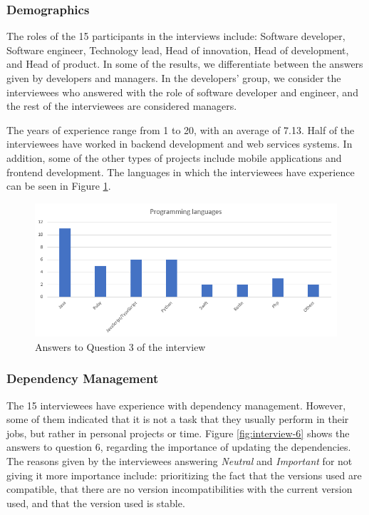 \subsubsection{Demographics}

The roles of the 15 participants in the interviews include: Software developer, Software engineer, Technology lead, Head of innovation, Head of development, and Head of product. In some of the results, we differentiate between the answers given by developers and managers. In the developers' group, we consider the interviewees who answered with the role of software developer and engineer, and the rest of the interviewees are considered managers. 

The years of experience range from 1 to 20, with an average of 7.13. Half of the interviewees have worked in backend development and web services systems. In addition, some of the other types of projects include mobile applications and frontend development. The languages in which the interviewees have experience can be seen in Figure \ref{fig:interview-3}.

\begin{figure}[ht!]
\begin{center}
\includegraphics[width=\textwidth]{figures/interview/Question3.png}
\caption{Answers to Question 3 of the interview}
\label{fig:interview-3}
\end{center}
\end{figure}

\subsubsection{Dependency Management}

The 15 interviewees have experience with dependency management. However, some of them indicated that it is not a task that they usually perform in their jobs, but rather in personal projects or time. Figure \ref{fig:interview-6} shows the answers to question 6, regarding the importance of updating the dependencies. The reasons given by the interviewees answering \textit{Neutral} and \textit{Important} for not giving it more importance include: prioritizing the fact that the versions used are compatible, that there are no version incompatibilities with the current version used, and that the version used is stable.

